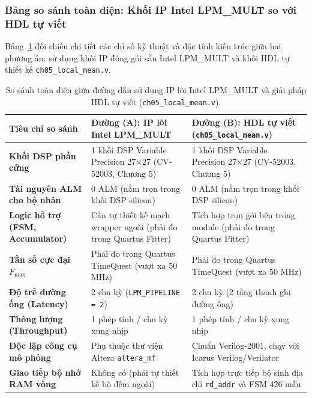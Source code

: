 \subsubsection*{Bảng so sánh toàn diện: Khối IP Intel LPM\_MULT so với HDL tự viết}
Bảng~\ref{tab:ch05_ip_vs_hdl} đối chiếu chi tiết các chỉ số kỹ thuật và đặc tính kiến trúc giữa hai phương án: sử dụng khối IP đóng gói sẵn Intel LPM\_MULT và khối HDL tự thiết kế \texttt{ch05\_local\_mean.v}.

\begin{table}[H]
\centering
\small
\caption{So sánh toàn diện giữa đường dẫn sử dụng IP lõi Intel LPM\_MULT và giải pháp HDL tự viết (\texttt{ch05\_local\_mean.v}).}
\label{tab:ch05_ip_vs_hdl}
\begin{tabularx}{\textwidth}{p{3.2cm}XX}
\toprule
\textbf{Tiêu chí so sánh} & \textbf{Đường (A): IP lõi Intel LPM\_MULT} & \textbf{Đường (B): HDL tự viết (\texttt{ch05\_local\_mean.v})} \\
\midrule
\textbf{Khối DSP phần cứng} & 1 khối DSP Variable Precision 27$\times$27 (CV-52003, Chương 5) & 1 khối DSP Variable Precision 27$\times$27 (CV-52003, Chương 5) \\
\textbf{Tài nguyên ALM cho bộ nhân} & 0 ALM (nằm trọn trong khối DSP silicon) & 0 ALM (nằm trọn trong khối DSP silicon) \\
\textbf{Logic hỗ trợ (FSM, Accumulator)} & Cần tự thiết kế mạch wrapper ngoài (phải đo trong Quartus Fitter) & Tích hợp trọn gói bên trong module (phải đo trong Quartus Fitter) \\
\textbf{Tần số cực đại $F_{\max}$} & Phải đo trong Quartus TimeQuest (vượt xa 50 MHz) & Phải đo trong Quartus TimeQuest (vượt xa 50 MHz) \\
\textbf{Độ trễ đường ống (Latency)} & 2 chu kỳ (\texttt{LPM\_PIPELINE = 2}) & 2 chu kỳ (2 tầng thanh ghi đường ống) \\
\textbf{Thông lượng (Throughput)} & 1 phép tính / chu kỳ xung nhịp & 1 phép tính / chu kỳ xung nhịp \\
\textbf{Độc lập công cụ mô phỏng} & Phụ thuộc thư viện Altera \texttt{altera\_mf} & Chuẩn Verilog-2001, chạy với Icarus Verilog/Verilator \\
\textbf{Giao tiếp bộ nhớ RAM vòng} & Không có (phải tự thiết kế bộ đếm ngoài) & Tích hợp trực tiếp bộ sinh địa chỉ \texttt{rd\_addr} và FSM 426 mẫu \\
\bottomrule
\end{tabularx}
\end{table}

